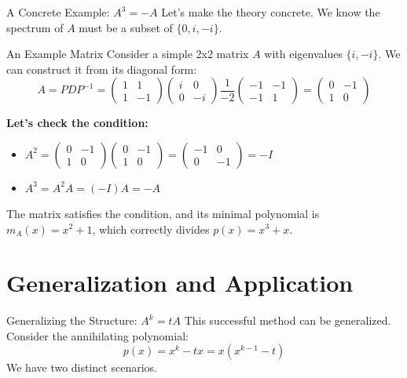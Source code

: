 \documentclass{beamer}
\begin{document}
\begin{frame}{A Concrete Example: $A^3 = -A$}
  Let's make the theory concrete. We know the spectrum of $A$ must be a subset of $\{0, i, -i\}$.
  \vfill
  \begin{block}{An Example Matrix}
  Consider a simple 2x2 matrix $A$ with eigenvalues $\{i, -i\}$. We can construct it from its diagonal form:
  \[ A = P D P^{-1} = \begin{pmatrix} 1 & 1 \\ 1 & -1 \end{pmatrix} \begin{pmatrix} i & 0 \\ 0 & -i \end{pmatrix} \frac{1}{-2} \begin{pmatrix} -1 & -1 \\ -1 & 1 \end{pmatrix} = \begin{pmatrix} 0 & -1 \\ 1 & 0 \end{pmatrix} \]
  \end{block}
  \vfill
  \pause %
  \textbf{Let's check the condition:}
  \begin{itemize}
    \item $A^2 = \begin{pmatrix} 0 & -1 \\ 1 & 0 \end{pmatrix} \begin{pmatrix} 0 & -1 \\ 1 & 0 \end{pmatrix} = \begin{pmatrix} -1 & 0 \\ 0 & -1 \end{pmatrix} = -I$
    \vfill
    \item $A^3 = A^2 A = (-I)A = -A$
  \end{itemize}
  \vfill
  The matrix satisfies the condition, and its minimal polynomial is $m_A(x) = x^2+1$, which correctly divides $p(x) = x^3+x$.
\end{frame}

\section{Generalization and Application}

\begin{frame}{Generalizing the Structure: $A^k = tA$}
  This successful method can be generalized. Consider the annihilating polynomial:
  \[ p(x) = x^k - tx = x(x^{k-1} - t) \]
  We have two distinct scenarios.
\end{frame}
\end{document}
